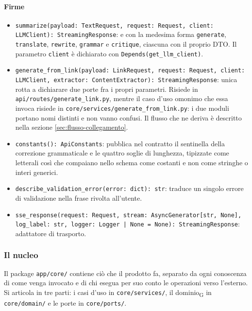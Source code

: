 \documentclass[a4paper, 10pt]{article}
\newenvironment{firme}{%
  \begin{itemize}[leftmargin=1.4em, topsep=4pt, itemsep=4pt, parsep=0pt]
  \raggedright
}{%
  \end{itemize}%
}
\begin{document}
\paragraph{Firme}
\begin{firme}
    \item \texttt{summarize(payload: TextRequest, request: Request, client: LLMClient): StreamingResponse}: e con la medesima forma \texttt{generate}, \texttt{translate}, \texttt{rewrite}, \texttt{grammar} e \texttt{critique}, ciascuna con il proprio DTO. Il parametro \texttt{client} è dichiarato con \texttt{Depends(get\_llm\_client)}.

    \item \texttt{generate\_from\_link(payload: LinkRequest, request: Request, client: LLMClient, extractor: ContentExtractor): StreamingResponse}: unica rotta a dichiarare due porte fra i propri parametri. Risiede in \texttt{api/routes/generate\_link.py}, mentre il caso d'uso omonimo che essa invoca risiede in \texttt{core/services/generate\_from\_link.py}: i due moduli portano nomi distinti e non vanno confusi. Il flusso che ne deriva è descritto nella sezione \ref{sec:flusso-collegamento}.

    \item \texttt{constants(): ApiConstants}: pubblica nel contratto il sentinella della correzione grammaticale e le quattro soglie di lunghezza, tipizzate come letterali così che compaiano nello schema come costanti e non come stringhe o interi generici.

    \item \texttt{describe\_validation\_error(error: dict): str}: traduce un singolo errore di validazione nella frase rivolta all'utente.

    \item \texttt{sse\_response(request: Request, stream: AsyncGenerator[str, None], log\_label: str, logger: Logger | None = None): StreamingResponse}: adattatore di trasporto.
\end{firme}

\subsubsection{Il nucleo}
\label{sec:backend-nucleo}
Il package \texttt{app/core/} contiene ciò che il prodotto fa, separato da ogni conoscenza di come venga invocato e di chi esegua per suo conto le operazioni verso l'esterno. Si articola in tre parti: i casi d'uso in \texttt{core/services/}, il dominio\textsubscript{G} in \texttt{core/domain/} e le porte in \texttt{core/ports/}.
\end{document}
